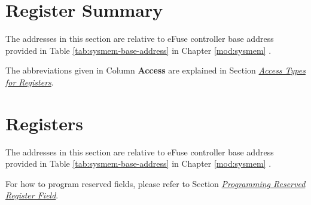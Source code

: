 \documentclass[main\_\_EN.tex]{subfiles}
\begin{document}



\newpage
\section{Register Summary}
\label{sec:efuse-reg-summ}
\hypertarget{efuse-reg-summ}{}

The addresses in this section are relative to eFuse controller base address provided in Table \ref{tab:sysmem-base-address} in Chapter \ref{mod:sysmem} \textit{}.

The abbreviations given in Column \textbf{Access} are explained in Section \hyperref[glossary-access-types]{\textit{Access Types for Registers}}.






\newpage
\section{Registers}

The addresses in this section are relative to eFuse controller base address provided in Table \ref{tab:sysmem-base-address} in Chapter \ref{mod:sysmem} \textit{}.

For how to program reserved fields, please refer to Section \hyperref[programming-reserved-field]{\textit{Programming Reserved Register Field}}.


\end{document}
